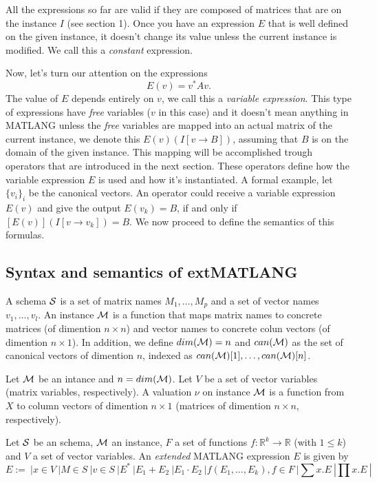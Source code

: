 All the expressions so far are valid if they are composed of matrices that are on the instance $I$ (see section 1). Once you have an expression $E$ that is well defined on the given instance, it doesn't change its value unless the current instance is modified. We call this a \textit{constant} expression.

Now, let's turn our attention on the expressions $$E(v)=v^* Av.$$ The value of $E$ depends entirely on $v$, we call this a \textit{variable expression}. This type of expressions have \textit{free} variables ($v$ in this case) and it doesn't mean anything in MATLANG unless the \textit{free} variables are mapped into an actual matrix of the current instance, we denote this $E(v)(I[v\rightarrow B])$, assuming that $B$ is on the domain of the given instance. This mapping will be accomplished trough operators that are introduced in the next section. These operators define how the variable expression $E$ is used and how it's instantiated.
A formal example, let $\lbrace v_i\rbrace_i$ be the canonical vectors. An operator could receive a variable expression $E(v)$ and give the output $E(v_k)=B$, if and only if $[E(v)](I[v\rightarrow v_k])=B$.
We now proceed to define the semantics of this formulas.

\subsection{Syntax and semantics of  extMATLANG}

A schema $\mathcal{S}$ is a set of matrix names $M_1,\ldots, M_p$ and a set of vector names $v_1,\ldots, v_l$.
An instance $\mathcal{M}$ is a function that maps matrix names to concrete matrices (of dimention $n\times n$) and vector names to concrete colun vectors (of dimention $n\times 1$). 
In addition, we define $dim(\mathcal{M})=n$ and $can(\mathcal{M})$ as the set of canonical vectors of dimention $n$, indexed as $can(\mathcal{M})[1], \ldots,can(\mathcal{M})[n]$.

Let $\mathcal{M}$ be an intance and $n=dim(\mathcal{M})$. Let $V$ be a set of vector variables (matrix variables, respectively). A valuation $\nu$ on instance $\mathcal{M}$ is a function from $X$ to column vectors of dimention $n\times 1$ (matrices of dimention $n\times n$, respectively). 

Let $\mathcal{S}$ be an schema, $\mathcal{M}$ an instance, $F$ a set of functions $f:\mathbb{R}^{k}\rightarrow\mathbb{R}$ (with $1\leq k$) and $V$ a set of vector variables. An \textit{extended} MATLANG expression $E$ is given by
$$
E:= \ | x\in V \ | M\in S \ | v\in S \ | E^* \ |E_1+E_2 \ | E_1\cdot E_2 \ | f(E_1,\ldots, E_k), f\in F \ | \sum x. E \ | \prod x. E \ |
$$

